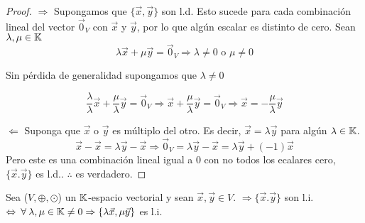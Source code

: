 \begin{proof}
    $\Rightarrow$ Supongamos que $\{ \vec{x}, \vec{y} \}$ son l.d. Esto sucede para cada combinación lineal del vector ${\vec{0}}_{V}$ con $\vec{x}$ y $\vec{y}$, por lo que algún escalar es distinto de cero. Sean $\lambda, \mu \in \mathbb{K}$
    \begin{equation*}
        \lambda \vec{x} + \mu \vec{y} = {\vec{0}}_{V} \Rightarrow \lambda \neq 0 \text{ o } \mu \neq 0
    \end{equation*}

    Sin pérdida de generalidad supongamos que $\lambda \neq 0$

    \begin{equation*}
         \frac{\lambda}{\lambda} \vec{x} + \frac{\mu}{\lambda} \vec{y} = {\vec{0}}_{V} \Rightarrow \vec{x} + \frac{\mu}{\lambda} \vec{y} = {\vec{0}}_{V} \Rightarrow  \vec{x} = - \frac{\mu}{\lambda} \vec{y}
    \end{equation*}

    $\Leftarrow$ Suponga que $\vec{x}$ o $\vec{y}$ es múltiplo del otro. Es decir, $\vec{x} = \lambda \vec{y}$ para algún $\lambda \in \mathbb{K}$. 
    \begin{equation*}
        \vec{x}-\vec{x} = \lambda \vec{y} -\vec{x} \Rightarrow {\vec{0}}_{V} =  \lambda \vec{y} -\vec{x} =  \lambda \vec{y} + (-1)\vec{x}
    \end{equation*}
    Pero este es una combinación lineal igual a 0 con no todos los ecalares cero, $\{ \vec{x}. \vec{y} \}$ es l.d.. $\therefore$  es verdadero.
\end{proof}

\begin{theorem}
    Sea ($V, \oplus, \odot$) un $\mathbb{K}$-espacio vectorial y sean $\vec{x}, \vec{y} \in V$. $\Rightarrow \{ \vec{x}. \vec{y} \}$ son l.i. $\Leftrightarrow \: \forall \: \lambda, \mu \in \mathbb{K} \neq 0 \Rightarrow \{ \lambda \vec{x}, \mu \vec{y} \}$ es l.i.
\end{theorem}

